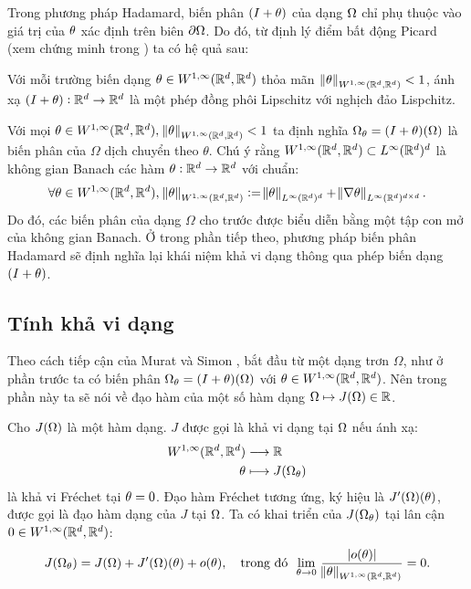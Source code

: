 \documentclass[
12pt, %
oneside, %
english, %
onehalfspacing, %
nolistspacing, %
headsepline, %
addchap,
]{MastersDoctoralThesis} %
\begin{document}
Trong phương pháp Hadamard, biến phân $(I+\theta)$ của dạng $\Omega$ chỉ phụ thuộc vào giá trị của $\theta$ xác định trên biên $\partial\Omega$. Do đó, từ định lý điểm bất động Picard (xem chứng minh trong \cite{All06}) ta có hệ quả sau:
\begin{lem} Với mỗi trường biến dạng $\theta \in W^{1,\infty}(\mathbb R^d,\mathbb R^d)$ thỏa mãn $\:\norm{\theta}_{W^{1,\infty} (\mathbb{R}^d,\mathbb{R}^d)}<1$, ánh xạ $(I+\theta):\mathbb R^d\rightarrow\mathbb R^d$ là một phép đồng phôi Lipschitz với nghịch đảo Lispchitz.
\end{lem}
Với mọi $\theta \in W^{1,\infty}(\mathbb R^d,\mathbb R^d),\: \norm{\theta}_{W^{1,\infty} (\mathbb{R}^d,\mathbb{R}^d)}<1$ ta định nghĩa $\Omega_\theta = (I+\theta)(\Omega)$ là biến phân của $\Omega$ dịch chuyển theo $\theta$. Chú ý rằng $W^{1,\infty}(\mathbb R^d,\mathbb R^d) \subset L^\infty(\mathbb R^d)^d$ là không gian Banach các hàm $\theta : \mathbb R^d \rightarrow \mathbb R^d$ với chuẩn:
$$\forall\theta \in W^{1,\infty}(\mathbb R^d,\mathbb R^d), \: \norm{\theta}_{W^{1,\infty} (\mathbb{R}^d,\mathbb{R}^d)} := \norm{\theta}_{L^\infty(\mathbb R^d)^d} + \norm{\nabla\theta}_{L^\infty(\mathbb R^d )^{d\times d}}.$$
Do đó, các biến phân của dạng $\Omega$ cho trước được biểu diễn bằng một tập con mở của không gian Banach. Ở trong phần tiếp theo, phương pháp biến phân Hadamard sẽ định nghĩa lại khái niệm khả vi dạng thông qua phép biến dạng $(I+\theta)$.
\subsection*{Tính khả vi dạng}
Theo cách tiếp cận của Murat và Simon \cite{MS76a, Sim80}, bắt đầu từ một dạng trơn $\Omega$, như ở phần trước ta có biến phân $\Omega_\theta = (I+\theta)(\Omega)$ với $\theta \in W^{1,\infty}(\mathbb{R}^d,\mathbb{R}^d)$. Nên trong phần này ta sẽ nói về đạo hàm của một số hàm dạng $\Omega \mapsto J(\Omega)\in\mathbb R$.
\begin{defi}\label{def:dhd}
Cho $J(\Omega)$ là một hàm dạng. $J$ được gọi là khả vi dạng tại $\Omega$ nếu ánh xạ:
\begin{align*}
W^{1,\infty}(\mathbb R^d,\mathbb R^d) &\longrightarrow \mathbb R\\
\theta &\longmapsto J(\Omega_{\theta})
\end{align*}
là khả vi Fr\'echet tại $\theta=0$. Đạo hàm Fr\'echet tương ứng, ký hiệu là $J'(\Omega)(\theta)$, được gọi là đạo hàm dạng của $J$ tại $\Omega$. Ta có khai triển của $J(\Omega_\theta)$ tại lân cận $0 \in W^{1,\infty}(\mathbb R^d,\mathbb R^d)$:
\begin{equation}\label{eq:dhd}
J(\Omega_{\theta})=J(\Omega)+J'(\Omega)(\theta)+o(\theta), \quad \text{trong đó  } \, \lim_{\theta\rightarrow 0}\,\dfrac{|o(\theta)|}{\norm{\theta}_{W^{1,\infty}(\mathbb R^d,\mathbb R^d)}} = 0.
\end{equation}
\end{defi}
\end{document}
